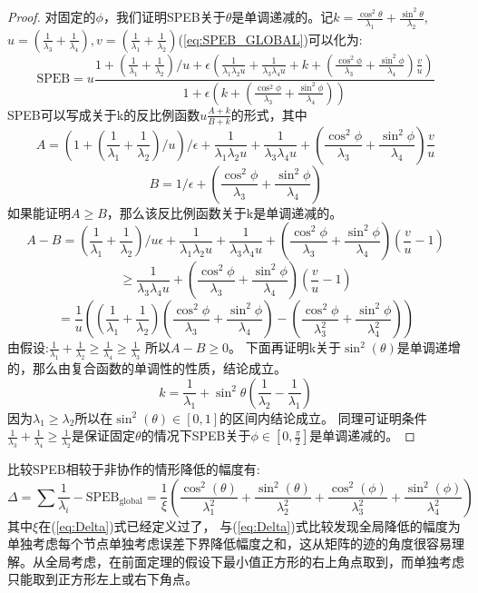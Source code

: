\documentclass[12pt]{article}
\theoremstyle{remark}
\begin{document}
\begin{proof}
对固定的$\phi$，我们证明SPEB关于$\theta$是单调递减的。记$k=\frac{\cos^2 \theta}{\lambda_1}+\frac{\sin^2 \theta}{\lambda_2}$,$u=(\frac{1}{\lambda_3}+\frac{1}{\lambda_4}),v=(\frac{1}{\lambda_1}+\frac{1}{\lambda_2})$(\ref{eq:SPEB_GLOBAL})可以化为:
\begin{equation}
\text{SPEB}=u\frac{1+(\frac{1}{\lambda_1}+\frac{1}{\lambda_2})/u+\epsilon(\frac{1}{\lambda_1\lambda_2 u}+\frac{1}{\lambda_3\lambda_4 u}+k+(\frac{\cos^2\phi}{\lambda_3}+\frac{\sin^2\phi}{\lambda_4})\frac{v}{u})}{1+\epsilon(k+(\frac{\cos^2\phi}{\lambda_3}+\frac{\sin^2\phi}{\lambda_4}))}
\end{equation}
SPEB可以写成关于k的反比例函数$u\frac{A+k}{B+k}$的形式，其中
\[
A=(1+(\frac{1}{\lambda_1}+\frac{1}{\lambda_2})/u)/\epsilon+\frac{1}{\lambda_1\lambda_2 u}+\frac{1}{\lambda_3\lambda_4 u}+(\frac{\cos^2\phi}{\lambda_3}+\frac{\sin^2\phi}{\lambda_4})\frac{v}{u}
\]
\[
B=1/\epsilon+(\frac{\cos^2\phi}{\lambda_3}+\frac{\sin^2\phi}{\lambda_4})
\]
如果能证明$A \geq B$，那么该反比例函数关于k是单调递减的。
\[
A-B=(\frac{1}{\lambda_1}+\frac{1}{\lambda_2})/u\epsilon+\frac{1}{\lambda_1\lambda_2 u}+\frac{1}{\lambda_3\lambda_4 u}+(\frac{\cos^2\phi}{\lambda_3}+\frac{\sin^2\phi}{\lambda_4})(\frac{v}{u}-1)
\]
\[
\geq \frac{1}{\lambda_3\lambda_4 u}+(\frac{\cos^2\phi}{\lambda_3}+\frac{\sin^2\phi}{\lambda_4})(\frac{v}{u}-1)
\]
\[
=\frac{1}{u}((\frac{1}{\lambda_1}+\frac{1}{\lambda_2})(\frac{\cos^2\phi}{\lambda_3}+\frac{\sin^2\phi}{\lambda_4})-(\frac{\cos^2\phi}{\lambda_3^2}+\frac{\sin^2\phi}{\lambda_4^2}))
\]
由假设:$\frac{1}{\lambda_1}+\frac{1}{\lambda_2}\geq\frac{1}{\lambda_4}\geq \frac{1}{\lambda_3}$
所以$A-B\geq 0$。
下面再证明k关于$\sin^2(\theta)$是单调递增的，那么由复合函数的单调性的性质，结论成立。
\[
k=\frac{1}{\lambda_1}+\sin^2 \theta(\frac{1}{\lambda_2}-\frac{1}{\lambda_1})
\]
因为$\lambda_1\geq \lambda_2$所以在$\sin^2(\theta)\in[0,1]$的区间内结论成立。
同理可证明条件$\frac{1}{\lambda_3}+\frac{1}{\lambda_4}\geq\frac{1}{\lambda_2}$是保证固定$\theta$的情况下SPEB关于$\phi \in [0,\frac{\pi}{2}]$是单调递减的。
\end{proof}
比较SPEB相较于非协作的情形降低的幅度有:
\begin{equation}
\Delta=\sum \frac{1}{\lambda_i}-\text{SPEB}_{\text{global}}=\frac{1}{\xi}(\frac{\cos^2(\theta)}{\lambda_1^2}+\frac{\sin^2(\theta)}{\lambda_2^2}+\frac{\cos^2(\phi)}{\lambda_3^2}+\frac{\sin^2(\phi)}{\lambda_4^2})
\end{equation}
其中$\xi$在(\ref{eq:Delta})式已经定义过了，
与(\ref{eq:Delta})式比较发现全局降低的幅度为单独考虑每个节点单独考虑误差下界降低幅度之和，这从矩阵的迹的角度很容易理解。从全局考虑，在前面定理的假设下最小值正方形的右上角点取到，而单独考虑只能取到正方形左上或右下角点。
\end{document}
